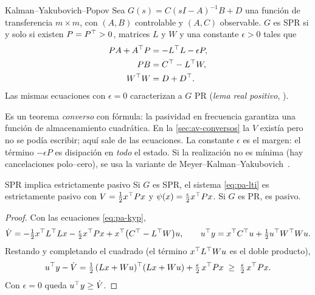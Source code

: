 \begin{lema}[label=lem:pa-kyp]{Kalman--Yakubovich--Popov \citep[Lema~6.3]{Kha02}}
Sea $G(s)=C(sI-A)^{-1}B+D$ una función de transferencia $m\times m$, con $(A,B)$ controlable y $(A,C)$ observable. $G$ es SPR si y solo si existen $P=P^{\top}>0$, matrices $L$ y $W$ y una constante $\epsilon>0$ tales que
\begin{equation}
  \begin{aligned}
  PA+A^{\top} P&=-L^{\top} L-\epsilon P,\\
  PB&=C^{\top}-L^{\top} W,\\
  W^{\top} W&=D+D^{\top} .
  \end{aligned}
  \label{eq:pa-kyp}
\end{equation}
Las mismas ecuaciones con $\epsilon=0$ caracterizan a $G$ PR (\emph{lema real positivo}, \citealp[Lema~6.2]{Kha02}).
\end{lema}

Es un teorema \emph{converso} con fórmula: la pasividad en frecuencia garantiza una función de almacenamiento cuadrática. En la \cref{sec:av-conversos} la $V$ existía pero no se podía escribir; aquí sale de las ecuaciones. La constante $\epsilon$ es el margen: el término $-\epsilon P$ es disipación en \emph{todo} el estado. Si la realización no es mínima (hay cancelaciones polo--cero), se usa la variante de Meyer--Kalman--Yakubovich~\citep{Mey65}.

\begin{lema}[label=lem:pa-sprpasivo]{SPR implica estrictamente pasivo \citep[Lema~6.4]{Kha02}}
Si $G$ es SPR, el sistema \eqref{eq:pa-lti} es estrictamente pasivo con $V=\tfrac12x^{\top} Px$ y $\psi(x)=\tfrac\epsilon2x^{\top} Px$. Si $G$ es PR, es pasivo.
\end{lema}

\begin{proof}
Con las ecuaciones \eqref{eq:pa-kyp},
\[
  \dot V=-\tfrac12x^{\top} L^{\top} Lx-\tfrac\epsilon2x^{\top} Px+x^{\top}\bigl(C^{\top}-L^{\top} W\bigr)u,
  \qquad
  u^{\top} y=x^{\top} C^{\top} u+\tfrac12u^{\top} W^{\top} Wu .
\]
Restando y completando el cuadrado (el término $x^{\top} L^{\top} Wu$ es el doble producto),
\begin{equation}
  u^{\top} y-\dot V=\tfrac12\,(Lx+Wu)^{\top}(Lx+Wu)+\tfrac\epsilon2\,x^{\top} Px\;\ge\;\tfrac\epsilon2\,x^{\top} Px .
  \label{eq:pa-kypidentidad}
\end{equation}
Con $\epsilon=0$ queda $u^{\top} y\ge\dot V$.
\end{proof}

